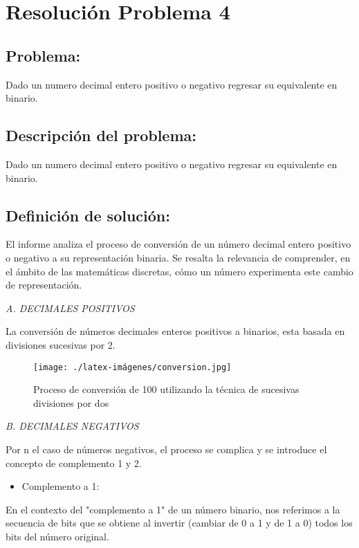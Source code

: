 \section{Resolución Problema 4}
\subsection{Problema:}
Dado un numero decimal entero positivo o negativo regresar su equivalente en binario.


\subsection{\textbf{Descripción del problema:}}
Dado un numero decimal entero positivo o negativo regresar su equivalente en binario.

\subsection{\textbf{Definición de solución:}}
El informe analiza el proceso de conversión de un número decimal entero positivo o negativo a su representación binaria. Se resalta la relevancia de comprender, en el ámbito de las matemáticas discretas, cómo un número experimenta este cambio de representación.
\newline


\item[{\ieeeguilsinglright}] {\it A. DECIMALES POSITIVOS }
   
La conversión de números decimales enteros positivos a binarios, esta basada en divisiones sucesivas por 2. 
\newline

\begin{figure}[h!]
    \centering
    \texttt{[image: ./latex-imágenes/conversion.jpg]}
    \caption{Proceso de conversión de 100 utilizando la técnica de sucesivas divisiones por dos}
    \vspace*{-5pt}
    \label{fig:dos}
\end{figure}


\item[{\ieeeguilsinglright}] {\it B. DECIMALES NEGATIVOS }

Por n el caso de números negativos, el proceso se complica y se introduce el concepto de complemento 1 y 2.

\begin{itemize}
    \item Complemento a 1:
\end{itemize}
En el contexto del "complemento a 1" de un número binario, nos referimos a la secuencia de bits que se obtiene al invertir (cambiar de 0 a 1 y de 1 a 0) todos los bits del número original. 
\newline

